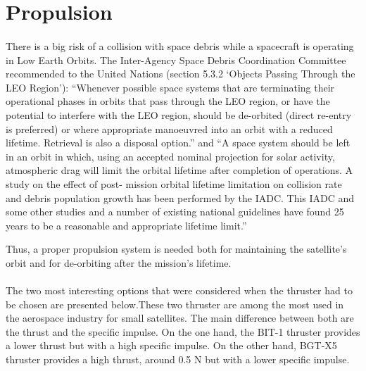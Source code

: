 \section{Propulsion} \label{Appendix:Propulsion}

\paragraph{}
There is a big risk of a collision with space debris while a spacecraft is operating in Low Earth Orbits. The Inter-Agency Space Debris Coordination Committee recommended to the United Nations (section 5.3.2 ‘Objects Passing Through the LEO Region’): “Whenever possible space systems that are terminating their operational phases in orbits that pass through the LEO region, or have the potential to interfere with the LEO region, should be de-orbited (direct re-entry is preferred) or where appropriate manoeuvred into an orbit with a reduced lifetime. Retrieval is also a disposal option.” and “A space system should be left in an orbit in which, using an accepted nominal projection for solar activity, atmospheric drag will limit the orbital lifetime after completion of operations. A study on the effect of post- mission orbital lifetime limitation on collision rate and debris population growth has been performed by the IADC. This IADC and some other studies and a number of existing national guidelines have found 25 years to be a reasonable and appropriate lifetime limit.” \cite{collisionLEO}

Thus, a proper propulsion system is needed both for maintaining the satellite's orbit and for de-orbiting after the mission's lifetime.
 
\paragraph{}The two most interesting options that were considered when the thruster had to be chosen are presented below.These two thruster are among the most used in the aerospace industry for small satellites. The main difference between both are the thrust and the specific impulse. On the one hand, the BIT-1 thruster provides a lower thrust but with a high specific impulse. On the other hand, BGT-X5 thruster provides a high thrust, around 0.5 N but with a lower specific impulse.

